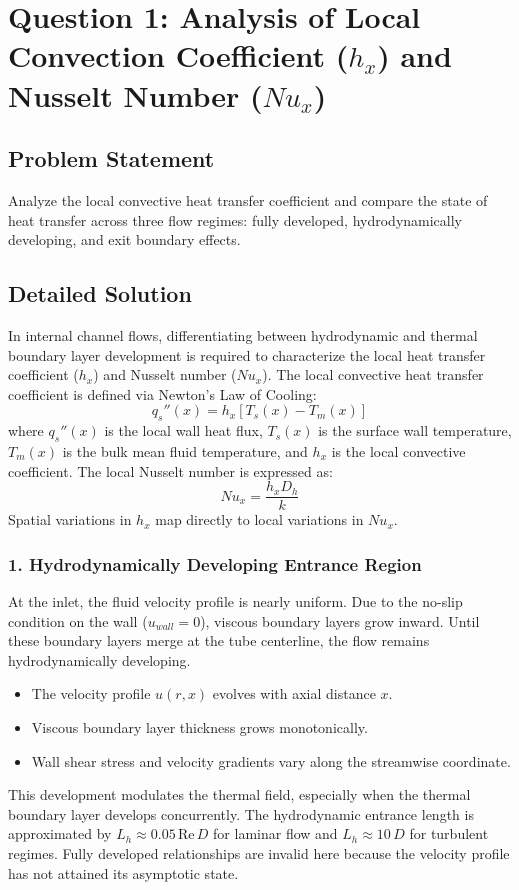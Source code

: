 \documentclass[12pt,a4paper]{report}
\begin{document}
\section{Question 1: Analysis of Local Convection Coefficient ($h_x$) and Nusselt Number ($Nu_x$)}

\subsection*{Problem Statement}
Analyze the local convective heat transfer coefficient and compare the state of heat transfer across three flow regimes: fully developed, hydrodynamically developing, and exit boundary effects.

\subsection*{Detailed Solution}
In internal channel flows, differentiating between hydrodynamic and thermal boundary layer development is required to characterize the local heat transfer coefficient ($h_x$) and Nusselt number ($Nu_x$). The local convective heat transfer coefficient is defined via Newton's Law of Cooling:
\begin{equation}
q_s''(x) = h_x [T_s(x) - T_m(x)]
\end{equation}
where $q_s''(x)$ is the local wall heat flux, $T_s(x)$ is the surface wall temperature, $T_m(x)$ is the bulk mean fluid temperature, and $h_x$ is the local convective coefficient. The local Nusselt number is expressed as:
\begin{equation}
Nu_x = \frac{h_x D_h}{k}
\end{equation}
Spatial variations in $h_x$ map directly to local variations in $Nu_x$.

\subsubsection{1. Hydrodynamically Developing Entrance Region}
At the inlet, the fluid velocity profile is nearly uniform. Due to the no-slip condition on the wall ($u_{wall} = 0$), viscous boundary layers grow inward. Until these boundary layers merge at the tube centerline, the flow remains hydrodynamically developing.
\begin{itemize}
    \item The velocity profile $u(r,x)$ evolves with axial distance $x$.
    \item Viscous boundary layer thickness grows monotonically.
    \item Wall shear stress and velocity gradients vary along the streamwise coordinate.
\end{itemize}
This development modulates the thermal field, especially when the thermal boundary layer develops concurrently. The hydrodynamic entrance length is approximated by $L_h \approx 0.05\,\text{Re}\,D$ for laminar flow and $L_h \approx 10\,D$ for turbulent regimes. Fully developed relationships are invalid here because the velocity profile has not attained its asymptotic state.
\end{document}
